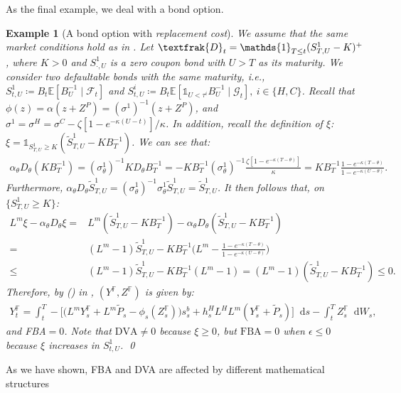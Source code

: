 \documentclass[a4paper, 11pt]{article}              %
\numberwithin{equation}{section}
\theoremstyle{plain}
\newcommand{\1}{\mathds{1}}
\newcommand{\calF}{\mathcal{F}}
\newcommand{\frD}{\textfrak{D}}
\newcommand{\calG}{\mathcal{G}}
\newcommand{\St}{\tilde{S}}
\newcommand{\pt}{\tilde{P}}
\newcommand{\dsE}{\mathbb{E}}
\newcommand{\dsF}{\mathbb{F}}
\theoremstyle{plain}
\theoremstyle{definition}
\newtheorem{example}[thm]{Example}
\theoremstyle{plain}
\newtheorem{example}{Example}
\newcommand*\df{\mathop{}\!\mathrm{d}}
\newcommand{\rom}[1]{\lowercase\expandafter{\romannumeral #1\relax}}
\begin{document}
As the final example, we deal with a bond option. 
\begin{example}[A bond option with \textit{replacement
    cost}]\label{example:bondoption}
  We assume that the same market conditions hold
  as in . Let $\frD_t = \1_{T\leq t}(S^1_{T, U}-K)^+$,
  where $K > 0$ and $S^1_{\cdot, U}$ is a zero coupon bond with $U>T$ as its
  maturity. We consider two defaultable bonds with the same maturity, i.e.,
 $S^1_{t, U} \coloneqq B_t\dsE[B_U^{-1}\mid\calF_t]$ and 
$ S^i_{t, U} \coloneqq B_t\dsE[\1_{U < \tau^i}B_U^{-1}\mid\calG_t], ~i \in \{H, C\}$. 
Recall  that $  \phi(z) = \alpha(z+Z^P) = (\sigma^1)^{-1}(z+Z^P)$, and 
$  \sigma^1 = \sigma^H = \sigma^C-\zeta [1-e^{-\kappa(U-t)}]/\kappa$. 
In addition, recall the definition of $\xi$: 
$ \xi =  \1_{ S^1_{T, U} \geq K}(\St^1_{T, U}-KB^{-1}_T)$. 
We can see that:
\begin{align}
  \alpha_\theta D_\theta (KB^{-1}_T)
  =(\sigma_\theta^1)^{-1}K D_\theta B_T^{-1} = -KB_T^{-1}(\sigma_\theta^1)^{-1}\frac{\zeta
     [1-e^{-\kappa(T-\theta)}]}{\kappa}
 = KB_T^{-1} \frac{1-e^{-\kappa(T-\theta)}}{1-e^{-\kappa(U-\theta)}}.\nonumber 
\end{align}
Furthermore, $ \alpha_\theta D_\theta \St^1_{T, U} = (\sigma_\theta^1)^{-1}\sigma_\theta^1  \St^1_{T, U} = \St^1_{T, U}$. 
It then follows that, on $\{ S^1_{T, U} \geq K\}$:
\begin{align}
  L^m \xi - \alpha_\theta D_\theta \xi
  =&L^m(\St^1_{T, U}-KB^{-1}_T)- \alpha_\theta D_\theta(\St^1_{T, U}-KB^{-1}_T)\nonumber\\
  =&(L^m-1)\St^1_{T, U} - KB^{-1}_T\bigg(L^m -
     \frac{1-e^{-\kappa(T-\theta)}}{1-e^{-\kappa(U-\theta)}}\bigg)\nonumber\\
  \leq&(L^m-1)\St^1_{T, U} - KB^{-1}_T(L^m -1)
     =(L^m-1)(\St^1_{T, U}- KB^{-1}_T) \leq0.\label{direction}
\end{align}
Therefore, by (\rom{1}) in ,  $(Y^\dsF,
Z^\dsF)$ is given by:
\begin{align}
  Y^\dsF_t = \int_{t}^{T} -\bigg[\Big(L^mY^\dsF_s
              +L^m\pt_s-\phi_s(Z^\dsF_s)\Big)s^{b}_s
              +h^H_sL^HL^m(Y^\dsF_s+\pt_s)\bigg]\df s
  -\int_{t}^{T}Z^\dsF_s\df W_s, \label{ex3:bsde}
\end{align}
and FBA$=0$. Note that  $\text{DVA}\not=0$ because $\xi \geq0$, but
$\text{FBA}=0$ when $\epsilon \leq0$ because $\xi$ increases in $S^1_{t, U}$. \qed
\end{example}
As we have shown, FBA and DVA are affected by different mathematical structures
\end{document}
